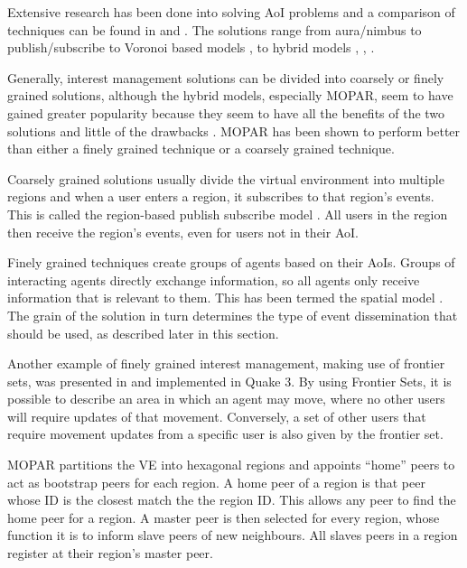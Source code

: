 Extensive research has been done into solving AoI problems and a comparison of techniques can be found in \cite{Boulanger_IM_compare} and \cite{IM_and_ED_survey_Krause}. The solutions range from aura/nimbus \cite{Benford_spatial_IM} to publish/subscribe  \cite{mercury_publish_subscribe} to Voronoi based models \cite{Hu_voronoi_IM},  \cite{Buyukkaya_voronoi_state_management} to hybrid models \cite{hybrid_IM}, \cite{MOPAR}, \cite{fan_mediator_paper}.

Generally, interest management solutions can be divided into coarsely or finely grained solutions, although the hybrid models, especially MOPAR, seem to have gained greater popularity because they seem to have all the benefits of the two solutions and little of the drawbacks \cite{MOPAR}. MOPAR has been shown to perform better than either a finely grained technique or a coarsely grained technique.

Coarsely grained solutions usually divide the virtual environment into multiple regions and when a user enters a region, it subscribes to that region's events. This is called the region-based publish subscribe model \cite{Fan_deisgn_issues_p2p}. All users in the region then receive the region's events, even for users not in their AoI.

Finely grained techniques create groups of agents based on their AoIs. Groups of interacting agents directly exchange information, so all agents only receive information that is relevant to them. This has been termed the spatial model \cite{Fan_deisgn_issues_p2p}. The grain of the solution in turn determines the type of event dissemination that should be used, as described later in this section.

Another example of finely grained interest management, making use of frontier sets, was presented in \cite{IM_frontier_sets} and implemented in Quake 3. By using Frontier Sets, it is possible to describe an area in which an agent may move, where no other users will require updates of that movement. Conversely, a set of other users that require movement updates from a specific user is also given by the frontier set.

MOPAR partitions the VE into hexagonal regions and appoints ``home'' peers to act as bootstrap peers for each region. A home peer of a region is that peer whose ID is the closest match the the region ID. This allows any peer to find the home peer for a region. A master peer is then selected for every region, whose function it is to inform slave peers of new neighbours. All slaves peers in a region register at their region's master peer.

